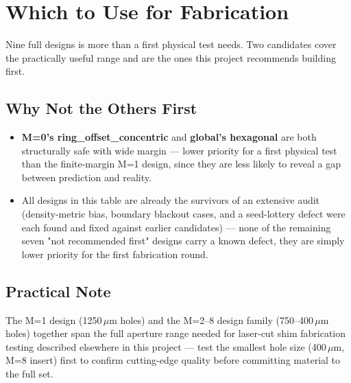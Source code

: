 \section{Which to Use for Fabrication}

Nine full designs is more than a first physical test needs. Two candidates
cover the practically useful range and are the ones this project recommends
building first.


\subsection{Why Not the Others First}
\begin{itemize}
  \item \textbf{M=0's ring\_offset\_concentric} and \textbf{global's
  hexagonal} are both structurally safe with wide margin --- lower priority
  for a first physical test than the finite-margin M=1 design, since they
  are less likely to reveal a gap between prediction and reality.
  \item All designs in this table are already the survivors of an extensive
  audit (density-metric bias, boundary blackout cases, and a seed-lottery
  defect were each found and fixed against earlier candidates) --- none of
  the remaining seven "not recommended first" designs carry a known defect,
  they are simply lower priority for the first fabrication round.
\end{itemize}

\subsection{Practical Note}
The M=1 design (1250\,$\mu$m holes) and the M=2--8 design family (750--400\,$\mu$m
holes) together span the full aperture range needed for laser-cut shim
fabrication testing described elsewhere in this project --- test the smallest
hole size (400\,$\mu$m, M=8 insert) first to confirm cutting-edge quality
before committing material to the full set.


